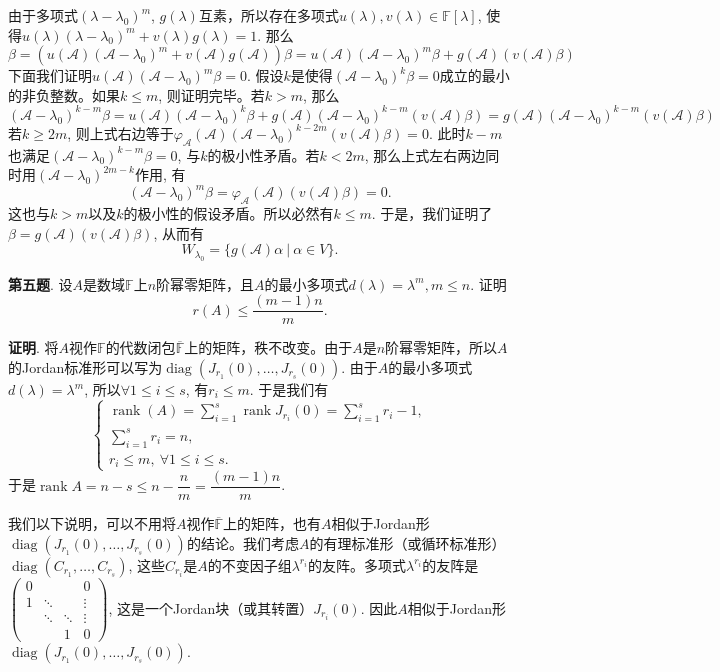 由于多项式$(\lambda - \lambda_0)^m$, $g(\lambda)$互素，所以存在多项式$u(\lambda), v(\lambda) \in \mathbb{F}[\lambda]$, 使得$u(\lambda)(\lambda-\lambda_0)^m + v(\lambda)g(\lambda) = 1.$ 那么
$$\beta = (u(\mathscr{A})(\mathscr{A}-\lambda_0)^m + v(\mathscr{A})g(\mathscr{A})) \beta = u(\mathscr{A})(\mathscr{A}-\lambda_0)^m \beta + g(\mathscr{A}) (v(\mathscr{A}) \beta)$$
下面我们证明$u(\mathscr{A})(\mathscr{A}-\lambda_0)^m \beta = 0$. 假设$k$是使得$(\mathscr{A} - \lambda_0)^k \beta = 0$成立的最小的非负整数。如果$k \leqslant m$, 则证明完毕。若$k > m$, 那么
$$(\mathscr{A}-\lambda_0)^{k-m} \beta = u(\mathscr{A})(\mathscr{A}-\lambda_0)^k \beta + g(\mathscr{A}) (\mathscr{A}-\lambda_0)^{k-m} (v(\mathscr{A}) \beta) = g(\mathscr{A}) (\mathscr{A}-\lambda_0)^{k-m} (v(\mathscr{A}) \beta)$$
若$k \geqslant 2m$, 则上式右边等于$\varphi_{\mathscr{A}}(\mathscr{A}) (\mathscr{A}-\lambda_0)^{k-2m} (v(\mathscr{A}) \beta) = 0.$ 此时$k - m$也满足$(\mathscr{A} - \lambda_0)^{k-m} \beta = 0$, 与$k$的极小性矛盾。若$k < 2m$, 那么上式左右两边同时用$(\mathscr{A}-\lambda_0)^{2m-k}$作用, 有
$$(\mathscr{A}-\lambda_0)^m \beta = \varphi_{\mathscr{A}}(\mathscr{A}) (v(\mathscr{A}) \beta) = 0.$$
这也与$k > m$以及$k$的极小性的假设矛盾。所以必然有$k \leqslant m$. 于是，我们证明了$\beta = g(\mathscr{A}) (v(\mathscr{A}) \beta)$, 从而有
$$W_{\lambda_0} = \{ g(\mathscr{A})\alpha \ |\ \alpha \in V \}.$$


\newpageorvspace


{\bf 第五题}. 设$A$是数域$\mathbb{F}$上$n$阶幂零矩阵，且$A$的最小多项式$d(\lambda) = \lambda^m, m\leqslant n$. 证明
$$r(A) \leqslant \dfrac{(m-1)n}{m}.$$

{\bf 证明}. 将$A$视作$\mathbb{F}$的代数闭包$\overline{\mathbb{F}}$上的矩阵，秩不改变。由于$A$是$n$阶幂零矩阵，所以$A$的Jordan标准形可以写为$\operatorname{diag}(J_{r_1}(0), \ldots, J_{r_s}(0))$. 由于$A$的最小多项式$d(\lambda) = \lambda^m$, 所以$\forall 1 \leqslant i \leqslant s$, 有$r_i \leqslant m$. 于是我们有
$$
\begin{cases}
\operatorname{rank}(A) = \sum\limits_{i=1}^s \operatorname{rank} J_{r_i}(0) = \sum\limits_{i=1}^s r_i - 1, \\
\sum\limits_{i=1}^s r_i = n, \\
r_i \leqslant m, ~ \forall 1 \leqslant i \leqslant s.
\end{cases}
$$
于是$\operatorname{rank} A = n - s \leqslant n - \dfrac{n}{m} = \dfrac{(m-1)n}{m}$.

我们以下说明，可以不用将$A$视作$\overline{\mathbb{F}}$上的矩阵，也有$A$相似于Jordan形$\operatorname{diag}(J_{r_1}(0), \ldots, J_{r_s}(0))$的结论。我们考虑$A$的有理标准形（或循环标准形）$\operatorname{diag}(C_{r_1}, \ldots, C_{r_s})$, 这些$C_{r_i}$是$A$的不变因子组$\lambda^{r_i}$的友阵。多项式$\lambda^{r_i}$的友阵是$\begin{pmatrix} 0 & & & 0 \\ 1 & \ddots & & \vdots \\ & \ddots & \ddots & \vdots \\ & & 1 & 0 \end{pmatrix}$, 这是一个Jordan块（或其转置）$J_{r_i}(0).$ 因此$A$相似于Jordan形$\operatorname{diag}(J_{r_1}(0), \ldots, J_{r_s}(0))$.


